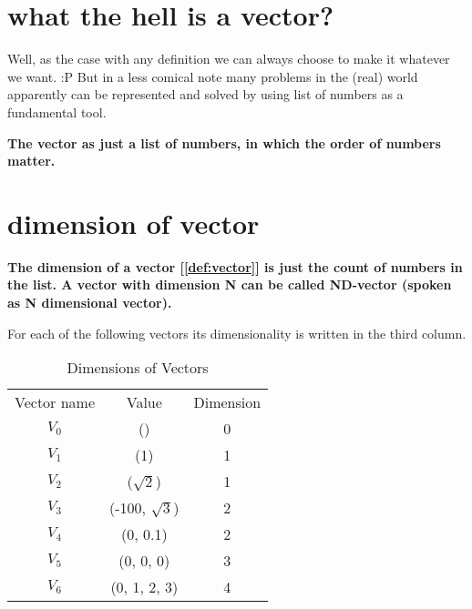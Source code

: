 \documentclass[../main.tex]{subfiles}
\begin{document}
\chapter{what the hell is a vector?}

Well, as the case with any definition we can always choose to make it whatever we want. :P
But in a less comical note many problems in the (real) world apparently can be represented and solved by using list of numbers as a fundamental tool.

\begin{definition}
  \label{def:vector}

  \textbf{The vector as just a list of numbers, in which the order of numbers matter.}

\end{definition}


\chapter{dimension of vector}
\begin{definition}
  \label{def:vector_dimension}

  \textbf{The dimension of a vector [\ref{def:vector}] is just the count of numbers in the list.
A vector with dimension N can be called ND-vector (spoken as N dimensional vector).}

\end{definition}

For each of the following vectors its dimensionality is written in the third column.

\begin{table}[ht]
  \centering
  \begin{tabular}{ c  c  c }
    Vector name & Value & Dimension\\
    $ V_0 $ & () & 0\\
    $ V_1 $ & (1) & 1\\
    $ V_2 $ & ($\sqrt{2}$) & 1\\
    $ V_3 $ & (-100, $\sqrt{3}$) & 2\\
    $ V_4 $ & (0, 0.1) & 2\\
    $ V_5 $ & (0, 0, 0) & 3\\
    $ V_6 $ & (0, 1, 2, 3) & 4\\
  \end{tabular}
\caption{Dimensions of Vectors}
\label{tab:dim}
\end{table}
\end{document}
